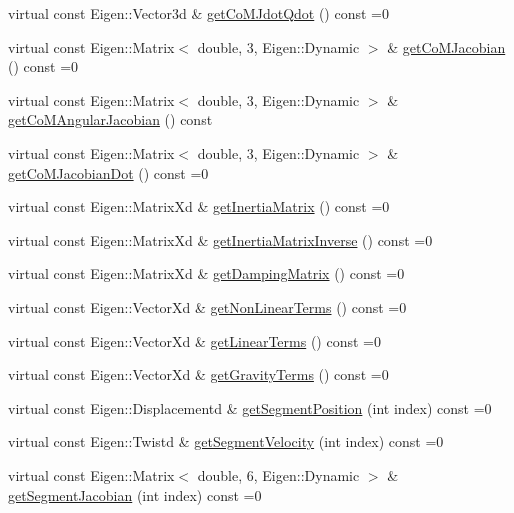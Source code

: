 \begin{DoxyCompactItemize}
\item 
virtual const Eigen\+::\+Vector3d \& \hyperlink{classocra_1_1Model_a2be9c0fdd8dbe4ecbb99eef5f4ea45d1}{get\+Co\+M\+Jdot\+Qdot} () const =0
\item 
virtual const Eigen\+::\+Matrix$<$ double, 3, Eigen\+::\+Dynamic $>$ \& \hyperlink{classocra_1_1Model_a4b148504194036b0faafe619e5b98f59}{get\+Co\+M\+Jacobian} () const =0
\item 
virtual const Eigen\+::\+Matrix$<$ double, 3, Eigen\+::\+Dynamic $>$ \& \hyperlink{classocra_1_1Model_ae3733acc7baa0d5ab3d3d5da88b0dd04}{get\+Co\+M\+Angular\+Jacobian} () const 
\item 
virtual const Eigen\+::\+Matrix$<$ double, 3, Eigen\+::\+Dynamic $>$ \& \hyperlink{classocra_1_1Model_abfc71fa0f52145b1df92bdbd0963c926}{get\+Co\+M\+Jacobian\+Dot} () const =0
\item 
virtual const Eigen\+::\+Matrix\+Xd \& \hyperlink{classocra_1_1Model_adf59aeee10c9d3babb05d7249bf71106}{get\+Inertia\+Matrix} () const =0
\item 
virtual const Eigen\+::\+Matrix\+Xd \& \hyperlink{classocra_1_1Model_ac1b1137365a6f6765d41d68bc02f3e62}{get\+Inertia\+Matrix\+Inverse} () const =0
\item 
virtual const Eigen\+::\+Matrix\+Xd \& \hyperlink{classocra_1_1Model_adfbe3160558dd221e7e91e2aad4d5089}{get\+Damping\+Matrix} () const =0
\item 
virtual const Eigen\+::\+Vector\+Xd \& \hyperlink{classocra_1_1Model_ac494939416d3ddcb6e5cf0ece43f3098}{get\+Non\+Linear\+Terms} () const =0
\item 
virtual const Eigen\+::\+Vector\+Xd \& \hyperlink{classocra_1_1Model_a0f9c628cb9e77d63744ccfd164e9beed}{get\+Linear\+Terms} () const =0
\item 
virtual const Eigen\+::\+Vector\+Xd \& \hyperlink{classocra_1_1Model_aef569d0c71ab76665e4a24d178e8243d}{get\+Gravity\+Terms} () const =0
\item 
virtual const Eigen\+::\+Displacementd \& \hyperlink{classocra_1_1Model_ae7afe827a1c09b99d80134a447bd9ccc}{get\+Segment\+Position} (int index) const =0
\item 
virtual const Eigen\+::\+Twistd \& \hyperlink{classocra_1_1Model_a1ee3b57487621c5194b7d6b014308e40}{get\+Segment\+Velocity} (int index) const =0
\item 
virtual const Eigen\+::\+Matrix$<$ double, 6, Eigen\+::\+Dynamic $>$ \& \hyperlink{classocra_1_1Model_a626aed0875f6336c2ecc0147bc8c7d4e}{get\+Segment\+Jacobian} (int index) const =0
\item 

\end{DoxyCompactItemize}
